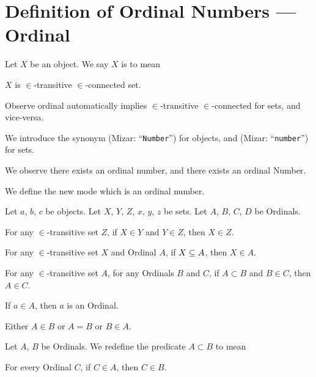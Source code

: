\documentclass{article}
\begin{document}
\section*{Definition of Ordinal Numbers --- Ordinal}

\begin{definition}
Let $X$ be an object. We say $X$ is  to mean
\begin{defn}
\item $X$ is $\in$-transitive $\in$-connected set.
\end{defn}
\end{definition}

Observe ordinal automatically implies $\in$-transitive $\in$-connected
for sets, and vice-versa.

\begin{notation}
We introduce the synonym  (Mizar: ``\verb#Number#'') for
objects, and  (Mizar: ``\verb#number#'') for sets.
\end{notation}

We observe there exists an ordinal number, and there exists an ordinal Number.

\begin{definition}
We define the new mode  which is an ordinal number.
\end{definition}

Let $a$, $b$, $c$ be objects. Let $X$, $Y$, $Z$, $x$, $y$, $z$ be sets.
Let $A$, $B$, $C$, $D$ be Ordinals.

\begin{thm}
\item\label{ordinal1:10} For any $\in$-transitive set $Z$, if $X\in Y$ and
  $Y\in Z$, then $X\in Z$.
\item\label{ordinal1:11} For any $\in$-transitive set $X$ and Ordinal $A$,
  if $X\properSubset A$, then $X\in A$.
\item\label{ordinal1:12} For any $\in$-transitive set $A$, for any
  Ordinals $B$ and $C$, if $A\subset B$ and $B\in C$, then $A\in C$.
\item\label{ordinal1:13} If $a\in A$, then $a$ is an Ordinal.
\item\label{ordinal1:14} Either $A\in B$ or $A=B$ or $B\in A$.
\end{thm}

\begin{definition}
Let $A$, $B$ be Ordinals. We redefine the predicate $A\subset B$ to mean
\begin{defn}
\item For every Ordinal $C$, if $C\in A$, then $C\in B$.
\end{defn}
\end{definition}
\end{document}
